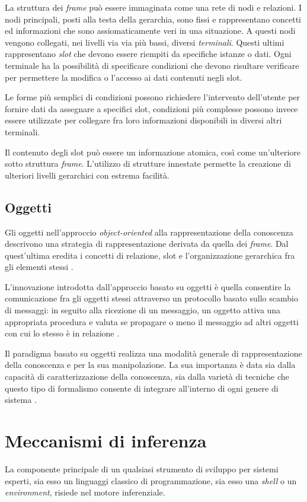 La struttura dei \emph{frame} può essere immaginata come una rete di nodi e relazioni. I nodi principali, posti alla testa della gerarchia, sono fissi e rappresentano concetti ed informazioni che sono assiomaticamente veri in una situazione. A questi nodi vengono collegati, nei livelli via via più bassi, diversi \emph{terminali}. Questi ultimi rappresentano \emph{slot} che devono essere riempiti da specifiche istanze o dati. Ogni terminale ha la possibilità di specificare condizioni che devono risultare verificare per permettere la modifica o l'accesso ai dati contenuti negli slot. 

Le forme più semplici di condizioni possono richiedere l'intervento dell'utente per fornire dati da assegnare a specifici slot, condizioni più complesse possono invece essere utilizzate per collegare fra loro informazioni disponibili in diversi altri terminali. 

Il contenuto degli slot può essere un informazione atomica, così come un'ulteriore sotto struttura \emph{frame}. L'utilizzo di strutture innestate permette la creazione di ulteriori livelli gerarchici con estrema facilità. \cite{minsky1974} 

\subsection{Oggetti}
Gli oggetti nell'approccio \emph{object-oriented} alla rappresentazione della conoscenza descrivono una strategia di rappresentazione derivata da quella dei \emph{frame}. Dal quest'ultima eredita i concetti di relazione, slot e l'organizzazione gerarchica fra gli elementi stessi \cite{holsapple1994object}.

L'innovazione introdotta dall'approccio basato su oggetti è quella consentire la comunicazione fra gli oggetti stessi attraverso un protocollo basato sullo scambio di messaggi: in seguito alla ricezione di un messaggio, un oggetto attiva una appropriata procedura e valuta se propagare o meno il messaggio ad altri oggetti con cui lo stesso è in relazione \cite{development1993}. 

Il paradigma basato su oggetti realizza una modalità generale di rappresentazione della conoscenza e per la sua manipolazione. La sua importanza è data sia dalla capacità di caratterizzazione della conoscenza, sia dalla varietà di tecniche che questo tipo di formalismo consente di integrare all'interno di ogni genere di sistema \cite{holsapple1994object}.

\section{Meccanismi di inferenza}
La componente principale di un qualsiasi strumento di sviluppo per sistemi esperti, sia esso un linguaggi classico di programmazione, sia esso una \emph{shell} o un \emph{environment}, risiede nel motore inferenziale.

